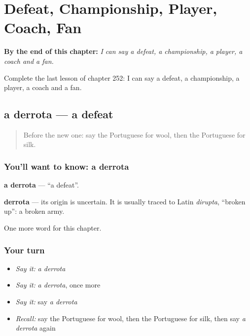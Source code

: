 
\chapter{Defeat, Championship, Player, Coach, Fan}
\label{ch:pt-defeat-championship-player-coach-fan}

\begin{chapteropening}
\textbf{By the end of this chapter:} \emph{I can say a defeat, a championship, a player, a coach and a fan.}

Complete the last lesson of chapter 252: I can say a defeat, a championship, a player, a coach and a fan.
\end{chapteropening}

\section[a derrota]{a derrota — a defeat}

\label{lesson:PT-C252-derrota}



\begin{quote}
Before the new one: say the Portuguese for wool, then the Portuguese for silk.
\end{quote}

\subsection*{You'll want to know: a derrota}
\textbf{a derrota} — \textquotedblleft{}a defeat\textquotedblright{}.

\begin{cousinweb}
\textbf{derrota} — its origin is uncertain. It is usually traced to Latin \emph{dirupta}, \textquotedblleft{}broken up\textquotedblright{}: a broken army.
\end{cousinweb}

\begin{grammarlens}[title={What you've built}]
One more word for this chapter.
\end{grammarlens}

\subsection*{Your turn}
\begin{itemize}
\raggedright
  \item \emph{Say it:} \emph{a derrota}
  \item \emph{Say it:} \emph{a derrota}, once more
  \item \emph{Say it:} say \emph{a derrota}
  \item \emph{Recall:} say the Portuguese for wool, then the Portuguese for silk, then say \emph{a derrota} again
\end{itemize}

